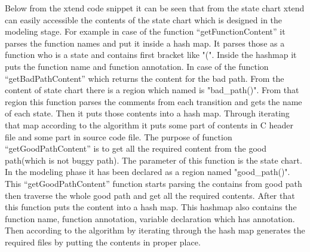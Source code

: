 Below from the xtend code snippet it can be seen that from the state chart xtend can easily accessible the contents of the state chart which is designed in the modeling stage. For example in case of the function \enquote{getFunctionContent} it parses the function names and put it inside a hash map. It parses those as a function who is a state and contains first bracket like "(". Inside the hashmap it puts the function name and function annotation. In case of the function \enquote{getBadPathContent} which returns the content for the bad path. From the content of state chart there is a region which named is "bad\_path()". From that region this function parses the comments from each transition and gets the name of each state. Then it puts those contents into a hash map. Through iterating that map according to the algorithm it puts some part of contents in C header file and some part in source code file. The purpose of function \enquote{getGoodPathContent} is to get all the required content from the good path(which is not buggy path). The parameter of this function is the state chart. In the modeling phase it has been declared as a region named "good\_path()". This \enquote{getGoodPathContent} function starts parsing the contains from good path then traverse the whole good path and get all the required contents. After that this function puts the content into a hash map. This hashmap also contains the function name, function annotation, variable declaration which has annotation. Then according to the algorithm by iterating through the hash map generates the required files by putting the contents in proper place. \\

